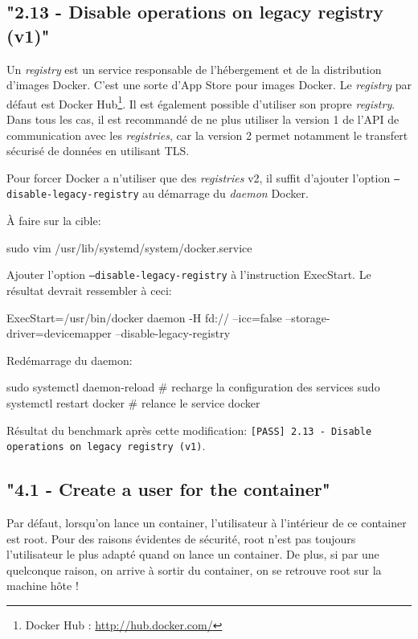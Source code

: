 \documentclass[11pt,a4paper,oneside]{report}
\newcommand{\code}[1]{\texttt{#1}}
\begin{document}
\subsection{"2.13 - Disable operations on legacy registry (v1)"}
Un \textit{registry} est un service responsable de l'hébergement et de la distribution d'images Docker. C'est une sorte d'App Store pour images Docker. Le \textit{registry} par défaut est Docker Hub\footnote{Docker Hub : \url{http://hub.docker.com/}}. Il est également possible d'utiliser son propre \textit{registry}. Dans tous les cas, il est recommandé de ne plus utiliser la version 1 de l'API de communication avec les \textit{registries}, car la version 2 permet notamment le transfert sécurisé de données en utilisant TLS\cite{blog_docker_registry_v2}.

Pour forcer Docker a n'utiliser que des \textit{registries} v2, il suffit d'ajouter l'option \code{--disable-legacy-registry} au démarrage du \textit{daemon} Docker.

À faire sur la cible:

\begin{bashcode}
sudo vim /usr/lib/systemd/system/docker.service
\end{bashcode}

Ajouter l'option \code{--disable-legacy-registry} à l'instruction ExecStart. Le résultat devrait ressembler à ceci:

\begin{bashcode}
ExecStart=/usr/bin/docker daemon -H fd:// --icc=false --storage-driver=devicemapper --disable-legacy-registry
\end{bashcode}

Redémarrage du daemon:

\begin{bashcode}
sudo systemctl daemon-reload # recharge la configuration des services
sudo systemctl restart docker # relance le service docker
\end{bashcode}

Résultat du benchmark après cette modification: \code{[PASS] 2.13 - Disable operations on legacy registry (v1)}.


\subsection{"4.1  - Create a user for the container"}\label{sc-create-user-for-container}
Par défaut, lorsqu'on lance un container, l'utilisateur à l'intérieur de ce container est root. Pour des raisons évidentes de sécurité, root n'est pas toujours l'utilisateur le plus adapté quand on lance un container. De plus, si par une quelconque raison, on arrive à sortir du container, on se retrouve root sur la machine hôte !
\end{document}
